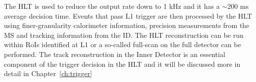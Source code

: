 



			The HLT is used to reduce the output rate down to 1 kHz and it has a $\sim$200 ms average decision time. Events that pass L1 trigger are then processed by the HLT using finer-granularity calorimeter information, precision measurements from the MS and tracking information from the ID. The HLT reconstruction can be run within RoIs identified at L1 or a so-called full-scan on the full detector can be performed. The track reconstruction in the Inner Detector is an essential component of the trigger decision in the HLT and it will be discussed more in detail in Chapter~\ref{ch:trigger}




